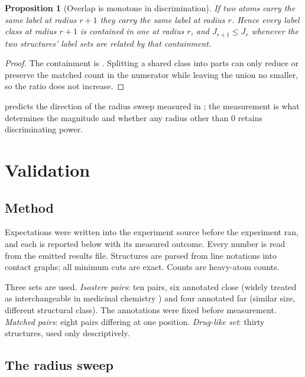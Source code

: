 \documentclass[11pt,twocolumn,a4paper]{article}
\theoremstyle{scthm}
\newtheorem{proposition}[theorem]{Proposition}
\theoremstyle{definition}
\theoremstyle{remark}
\begin{document}
\begin{proposition}[Overlap is monotone in discrimination]
\label{prop:overlap-monotone}
If two atoms carry the same label at radius $r+1$ they carry the same
label at radius $r$. Hence every label class at radius $r+1$ is contained
in one at radius $r$, and $J_{r+1}\le J_r$ whenever the two structures'
label sets are related by that containment.
\end{proposition}

\begin{proof}
The containment is . Splitting a shared class into
parts can only reduce or preserve the matched count in the numerator while
leaving the union no smaller, so the ratio does not increase.
\end{proof}

 predicts the direction of the radius sweep
measured in ; the measurement is what determines the
magnitude and whether any radius other than $0$ retains discriminating
power.

\section{Validation}
\label{sec:validation}

\subsection{Method}

Expectations were written into the experiment source before the
experiment ran, and each is reported below with its measured outcome.
Every number is read from the emitted results file. Structures are parsed
from line notations \citep{weininger1988} into contact graphs; all minimum
cuts are exact. Counts are heavy-atom counts.

Three sets are used. \emph{Isostere pairs}: ten pairs, six annotated
\textsf{close} (widely treated as interchangeable in medicinal chemistry
\citep{patani1996,meanwell2011}) and four annotated \textsf{far} (similar
size, different structural class). The annotations were fixed before
measurement. \emph{Matched pairs}: eight pairs differing at one position.
\emph{Drug-like set}: thirty structures, used only descriptively.



\subsection{The radius sweep}
\end{document}

